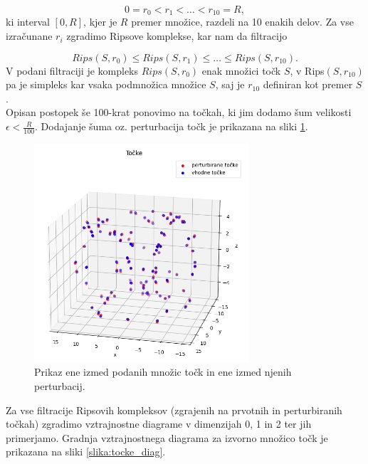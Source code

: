 \documentclass[a4paper,11pt]{article}
\theoremstyle{definition}
\theoremstyle{plain}
\begin{document}
\begin{equation}\label{eq:r}
     0 = r_0 < r_1 < \ldots < r_{10} = R,
\end{equation}
\noindent
ki interval $[0, R]$, kjer je $R$ premer množice, razdeli na 10 enakih delov. 
Za vse izračunane $r_i$ zgradimo Ripsove komplekse, kar nam da filtracijo 

\begin{equation}\label{eq:filtr}
    Rips(S, r_0) \leq Rips(S, r_1) \leq \ldots \leq Rips(S, r_{10}).
\end{equation}
\noindent
V podani filtraciji je kompleks $Rips(S, r_0)$ enak množici točk $S$, v Rips$(S,r_{10})$ pa je simpleks kar vsaka podmnožica množice $S$, saj je $r_{10}$ definiran kot premer $S$.
\\
Opisan postopek še 100-krat ponovimo na točkah, ki jim dodamo šum velikosti $\epsilon < \frac{R}{100}$. Dodajanje šuma oz. perturbacija točk je prikazana na sliki \ref{slika:orig_noise}.

\begin{figure}[ht!]
    \centering
    \includegraphics[width=80mm]{../slike/orig_noise3d.png}
    \caption{Prikaz ene izmed podanih množic točk in ene izmed njenih perturbacij.}
    \label{slika:orig_noise}
\end{figure}
\noindent
Za vse filtracije Ripsovih kompleksov (zgrajenih na prvotnih in perturbiranih točkah) zgradimo vztrajnostne diagrame v dimenzijah 0, 1 in 2 ter jih primerjamo.
Gradnja vztrajnostnega diagrama za izvorno množico točk je prikazana na sliki \ref{slika:tocke_diag}.
\end{document}
